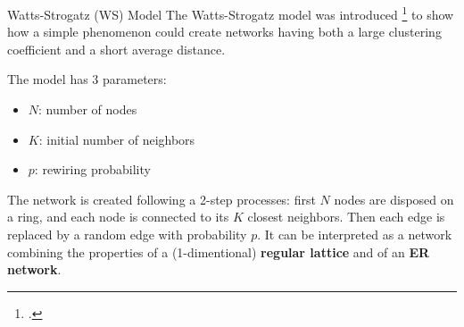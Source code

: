 \documentclass[a4paper,11pt]{book}
\begin{document}
\begin{textbox}{Watts-Strogatz (WS) Model}
The Watts-Strogatz model was introduced \footcite{watts1998collective} to show how a simple phenomenon could create networks having both a large clustering coefficient and a short average distance.

The model has 3 parameters:
\begin{itemize}
    \item $N$: number of nodes
    \item $K$: initial number of neighbors
    \item $p$: rewiring probability
\end{itemize}

The network is created following a 2-step processes: first $N$ nodes are disposed on a ring, and each node is connected to its $K$ closest neighbors. Then each edge is replaced by a random edge with probability $p$. It can be interpreted as a network combining the properties of a (1-dimentional) \textbf{regular lattice} and of an \textbf{ER network}.


\end{textbox}
\end{document}
